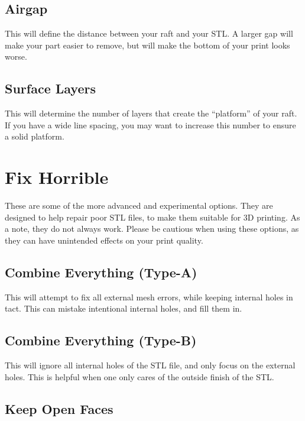 \subsection{Airgap}

This will define the distance between your raft and your STL. A larger gap will make your part easier to remove, but will make the bottom of your print looks worse.

\subsection{Surface Layers}

This will determine the number of layers that create the “platform” of your raft. If you have a wide line spacing, you may want to increase this number to ensure a solid platform. 

\section{Fix Horrible}

These are some of the more advanced and experimental options. They are designed to help repair poor STL files, to make them suitable for 3D printing. As a note, they do not always work. Please be cautious when using these options, as they can have unintended effects on your print quality.

\subsection{Combine Everything (Type-A)}

This will attempt to fix all external mesh errors, while keeping internal holes in tact. This can mistake intentional internal holes, and fill them in.

\subsection{Combine Everything (Type-B)}

This will ignore all internal holes of the STL file, and only focus on the external holes. This is helpful when one only cares of the outside finish of the STL.

\subsection{Keep Open Faces}

